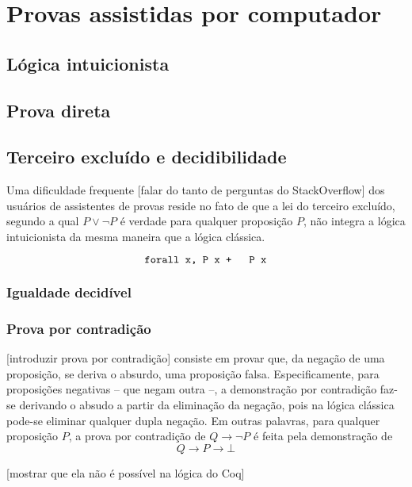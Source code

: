 \chapter{Provas assistidas por computador}
\label{cap:coq}

\section{Lógica intuicionista}

\section{Prova direta}

\section{Terceiro excluído e decidibilidade}

Uma dificuldade frequente [falar do tanto de perguntas do StackOverflow] dos usuários de assistentes de provas reside no fato de que a lei do terceiro excluído, segundo a qual $P \vee \neg P$ é verdade para qualquer proposição $P$, não integra a lógica intuicionista da mesma maneira que a lógica clássica.

$$\text{\texttt{forall x, {P x} + {~ P x}}}$$

\subsection{Igualdade decidível}
\label{ssec:eq_decidivel}

\subsection{Prova por contradição}

[introduzir prova por contradição] consiste em provar que, da negação de uma proposição, se deriva o absurdo, uma proposição falsa. Especificamente, para proposições negativas -- que negam outra --, a demonstração por contradição faz-se derivando o absudo a partir da eliminação da negação, pois na lógica clássica pode-se eliminar qualquer dupla negação. Em outras palavras, para qualquer proposição $P$, a prova por contradição de $Q \to \neg P$ é feita pela demonstração de \begin{equation}Q \to P \to \bot \label{eq:clas_neg}\end{equation}

[mostrar que ela não é possível na lógica do Coq]

